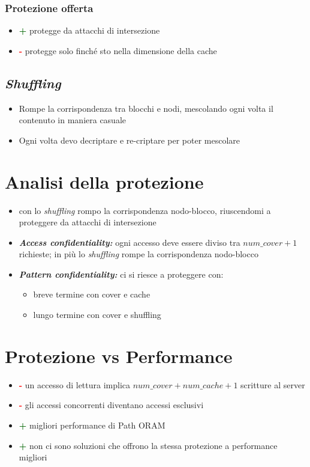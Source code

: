 \documentclass{report}
\begin{document}
\subsubsection{Protezione offerta}
\begin{itemize}
    \item \textcolor{darkgreen}{\textbf{+}} protegge da attacchi di intersezione
    \item \textcolor{red}{\textbf{-}} protegge solo finché sto nella dimensione della cache
\end{itemize}

\subsection{\textit{Shuffling}}
\begin{itemize}
    \item Rompe la corrispondenza tra blocchi e nodi, mescolando ogni volta il contenuto in maniera casuale
    \item Ogni volta devo decriptare e re-criptare per poter mescolare
\end{itemize}

\newpage
\section{Analisi della protezione}
\begin{itemize}
    \item con lo \textit{shuffling} rompo la corrispondenza nodo-blocco, riuscendomi a proteggere 
    da attacchi di intersezione
    \item \textbf{\textit{Access confidentiality:}} ogni accesso deve essere diviso tra $num\_cover + 1$ richieste;
    in più lo \textit{shuffling} rompe la corrispondenza nodo-blocco
    \item \textbf{\textit{Pattern confidentiality:}} ci si riesce a proteggere con:
    \begin{itemize}
        \item breve termine con cover e cache 
        \item lungo termine con cover e shuffling
    \end{itemize}
\end{itemize}

\section{Protezione vs Performance}
\begin{itemize}
    \item \textcolor{red}{\textbf{-}} un accesso di lettura implica $num\_cover + num\_cache + 1$ scritture al server 
    \item \textcolor{red}{\textbf{-}} gli accessi concorrenti diventano accessi esclusivi 
    \item \textcolor{darkgreen}{\textbf{+}} migliori performance di Path ORAM 
    \item \textcolor{darkgreen}{\textbf{+}} non ci sono soluzioni che offrono la stessa protezione a performance migliori
\end{itemize}
\end{document}
